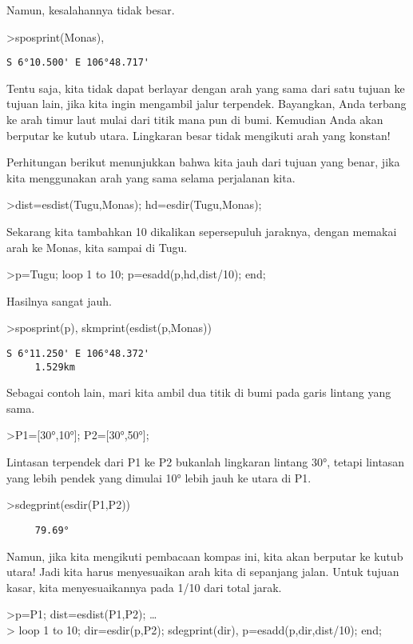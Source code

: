 \documentclass[
]{book}
\begin{document}
Namun, kesalahannya tidak besar.

\textgreater sposprint(Monas),

\begin{verbatim}
S 6°10.500' E 106°48.717'
\end{verbatim}

Tentu saja, kita tidak dapat berlayar dengan arah yang sama dari satu tujuan ke tujuan lain, jika kita ingin mengambil jalur terpendek. Bayangkan, Anda terbang ke arah timur laut mulai dari titik mana pun di bumi. Kemudian Anda akan berputar ke kutub utara. Lingkaran besar tidak mengikuti arah yang konstan!

Perhitungan berikut menunjukkan bahwa kita jauh dari tujuan yang benar, jika kita menggunakan arah yang sama selama perjalanan kita.

\textgreater dist=esdist(Tugu,Monas); hd=esdir(Tugu,Monas);

Sekarang kita tambahkan 10 dikalikan sepersepuluh jaraknya, dengan memakai arah ke Monas, kita sampai di Tugu.

\textgreater p=Tugu; loop 1 to 10; p=esadd(p,hd,dist/10); end;

Hasilnya sangat jauh.

\textgreater sposprint(p), skmprint(esdist(p,Monas))

\begin{verbatim}
S 6°11.250' E 106°48.372'
     1.529km
\end{verbatim}

Sebagai contoh lain, mari kita ambil dua titik di bumi pada garis lintang yang sama.

\textgreater P1={[}30°,10°{]}; P2={[}30°,50°{]};

Lintasan terpendek dari P1 ke P2 bukanlah lingkaran lintang 30°, tetapi lintasan yang lebih pendek yang dimulai 10° lebih jauh ke utara di P1.

\textgreater sdegprint(esdir(P1,P2))

\begin{verbatim}
     79.69°
\end{verbatim}

Namun, jika kita mengikuti pembacaan kompas ini, kita akan berputar ke kutub utara! Jadi kita harus menyesuaikan arah kita di sepanjang jalan. Untuk tujuan kasar, kita menyesuaikannya pada 1/10 dari total jarak.

\textgreater p=P1; dist=esdist(P1,P2); \ldots{}\\
\textgreater{} loop 1 to 10; dir=esdir(p,P2); sdegprint(dir), p=esadd(p,dir,dist/10); end;
\end{document}
